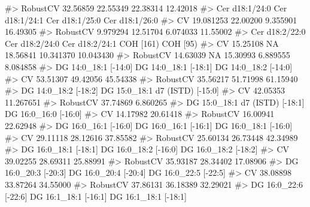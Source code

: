 \documentclass[
  letterpaper,
  DIV=11,
  numbers=noendperiod]{scrreprt}
\newenvironment{Shaded}{\begin{snugshade}}{\end{snugshade}}
\newcommand{\CommentTok}[1]{\textcolor[rgb]{0.37,0.37,0.37}{#1}}
\begin{document}
\begin{Shaded}
\begin{Highlighting}[]
\CommentTok{\#\textgreater{} RobustCV       32.56859       22.55349       22.38314       12.42018}
\CommentTok{\#\textgreater{}          Cer d18:1/24:0 Cer d18:1/24:1 Cer d18:1/25:0 Cer d18:1/26:0}
\CommentTok{\#\textgreater{} CV            19.081253       22.00200       9.355901       16.49305}
\CommentTok{\#\textgreater{} RobustCV       9.979294       12.51704       6.074033       11.55002}
\CommentTok{\#\textgreater{}          Cer d18:2/22:0 Cer d18:2/24:0 Cer d18:2/24:1 COH [161)  COH [95)}
\CommentTok{\#\textgreater{} CV             15.25108             NA       18.56841 10.341370 10.043430}
\CommentTok{\#\textgreater{} RobustCV       14.63039             NA       15.30993  6.889555  8.084858}
\CommentTok{\#\textgreater{}          DG 14:0\_18:1 [{-}14:0] DG 14:0\_18:1 [{-}18:1] DG 14:0\_18:2 [{-}14:0]}
\CommentTok{\#\textgreater{} CV                   53.51307             49.42056             45.54338}
\CommentTok{\#\textgreater{} RobustCV             35.56217             51.71998             61.15940}
\CommentTok{\#\textgreater{}          DG 14:0\_18:2 [{-}18:2] DG 15:0\_18:1 d7 (ISTD) [{-}15:0]}
\CommentTok{\#\textgreater{} CV                   42.05353                      11.267651}
\CommentTok{\#\textgreater{} RobustCV             37.74869                       6.860265}
\CommentTok{\#\textgreater{}          DG 15:0\_18:1 d7 (ISTD) [{-}18:1] DG 16:0\_16:0 [{-}16:0]}
\CommentTok{\#\textgreater{} CV                             14.17982             20.61418}
\CommentTok{\#\textgreater{} RobustCV                       16.00941             22.62948}
\CommentTok{\#\textgreater{}          DG 16:0\_16:1 [{-}16:0] DG 16:0\_16:1 [{-}16:1] DG 16:0\_18:1 [{-}16:0]}
\CommentTok{\#\textgreater{} CV                   29.11118             28.12616             37.85582}
\CommentTok{\#\textgreater{} RobustCV             25.60134             26.73448             42.34989}
\CommentTok{\#\textgreater{}          DG 16:0\_18:1 [{-}18:1] DG 16:0\_18:2 [{-}16:0] DG 16:0\_18:2 [{-}18:2]}
\CommentTok{\#\textgreater{} CV                   39.02255             28.69311             25.88991}
\CommentTok{\#\textgreater{} RobustCV             35.93187             28.34402             17.08906}
\CommentTok{\#\textgreater{}          DG 16:0\_20:3 [{-}20:3] DG 16:0\_20:4 [{-}20:4] DG 16:0\_22:5 [{-}22:5]}
\CommentTok{\#\textgreater{} CV                   38.08898             33.87264             34.55000}
\CommentTok{\#\textgreater{} RobustCV             37.86131             36.18389             32.29021}
\CommentTok{\#\textgreater{}          DG 16:0\_22:6 [{-}22:6] DG 16:1\_18:1 [{-}16:1] DG 16:1\_18:1 [{-}18:1]}

\end{Highlighting}
\end{Shaded}
\end{document}
